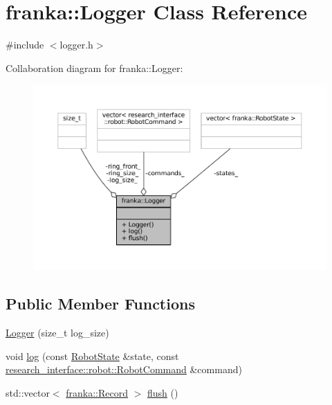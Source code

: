 \hypertarget{classfranka_1_1Logger}{}\section{franka\+:\+:Logger Class Reference}
\label{classfranka_1_1Logger}


{\ttfamily \#include $<$logger.\+h$>$}



Collaboration diagram for franka\+:\+:Logger\+:
\nopagebreak
\begin{figure}[H]
\begin{center}
\leavevmode
\includegraphics[width=350pt]{classfranka_1_1Logger__coll__graph}
\end{center}
\end{figure}
\subsection*{Public Member Functions}
\begin{DoxyCompactItemize}
\item 
\hyperlink{classfranka_1_1Logger_acc350f37e055aad0d47c7a90695354d2}{Logger} (size\+\_\+t log\+\_\+size)
\item 
void \hyperlink{classfranka_1_1Logger_aee4bfea6a4081c4ed9ee2abd2f62a0cd}{log} (const \hyperlink{structfranka_1_1RobotState}{Robot\+State} \&state, const \hyperlink{structresearch__interface_1_1robot_1_1RobotCommand}{research\+\_\+interface\+::robot\+::\+Robot\+Command} \&command)
\item 
std\+::vector$<$ \hyperlink{structfranka_1_1Record}{franka\+::\+Record} $>$ \hyperlink{classfranka_1_1Logger_a44b15a95e25dabe93f797c1d9651fb6e}{flush} ()
\end{DoxyCompactItemize}
